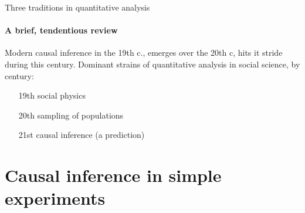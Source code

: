 

\begin{frame}[handout:0]{Three traditions in quantitative analysis}
\framesubtitle{A brief, tendentious review}

Modern causal inference in the 19th c., emerges over the 20th c, hits
it stride during this century. Dominant strains of quantitative
analysis in social science, by century:

\begin{itemize}
\item[19th] social physics
\item[20th] sampling of populations
\item[21st] causal inference (a prediction)
\end{itemize}

  
\end{frame}

\section{Causal inference in simple experiments}

